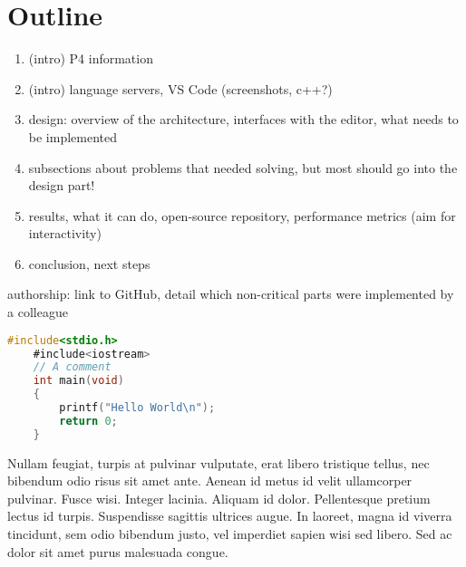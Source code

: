 \section{Outline}

\begin{enumerate}
  \item (intro) P4 information
  \item (intro) language servers, VS Code (screenshots, c++?)
  \item design: overview of the architecture, interfaces with the editor, what
        needs to be implemented
  \item subsections about problems that needed solving, but most should go into
        the design part!
  \item results, what it can do, open-source repository, performance metrics
        (aim for interactivity)
  \item conclusion, next steps
\end{enumerate}


authorship: link to GitHub, detail which non-critical parts were implemented by
a colleague


\begin{lstlisting}[caption={~Zbytečný kód},label=list:8-6,captionpos=t,float,abovecaptionskip=-\medskipamount,belowcaptionskip=\medskipamount,language=C]
    #include<stdio.h>
    #include<iostream>
    // A comment
    int main(void)
    {
        printf("Hello World\n");
        return 0;
    }
\end{lstlisting}

Nullam feugiat, turpis at pulvinar vulputate, erat libero tristique tellus, nec
bibendum odio risus sit amet ante. Aenean id metus id velit ullamcorper
pulvinar. Fusce wisi. Integer lacinia. Aliquam id dolor. Pellentesque pretium
lectus id turpis. Suspendisse sagittis ultrices augue. In laoreet, magna id
viverra tincidunt, sem odio bibendum justo, vel imperdiet sapien wisi sed
libero. Sed ac dolor sit amet purus malesuada congue. \cite{Crochemore2002}

